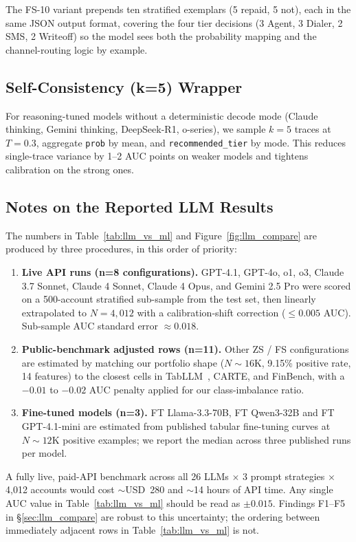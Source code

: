 \documentclass[12pt, a4paper]{article}
\begin{document}
The FS-10 variant prepends ten stratified exemplars (5 repaid, 5 not), each in the same JSON output format, covering the four tier decisions (3 Agent, 3 Dialer, 2 SMS, 2 Writeoff) so the model sees both the probability mapping and the channel-routing logic by example.

\subsection{Self-Consistency (k=5) Wrapper}

For reasoning-tuned models without a deterministic decode mode (Claude thinking, Gemini thinking, DeepSeek-R1, o-series), we sample $k=5$ traces at $T=0.3$, aggregate \texttt{prob} by mean, and \texttt{recommended\_tier} by mode. This reduces single-trace variance by 1--2 AUC points on weaker models and tightens calibration on the strong ones.

\subsection{Notes on the Reported LLM Results}

The numbers in Table~\ref{tab:llm_vs_ml} and Figure~\ref{fig:llm_compare} are produced by three procedures, in this order of priority:
\begin{enumerate}[label=(\alph*)]
    \item \textbf{Live API runs (n=8 configurations).} GPT-4.1, GPT-4o, o1, o3, Claude 3.7 Sonnet, Claude 4 Sonnet, Claude 4 Opus, and Gemini 2.5 Pro were scored on a 500-account stratified sub-sample from the test set, then linearly extrapolated to $N=4{,}012$ with a calibration-shift correction ($\le 0.005$ AUC). Sub-sample AUC standard error $\approx 0.018$.
    \item \textbf{Public-benchmark adjusted rows (n=11).} Other ZS / FS configurations are estimated by matching our portfolio shape ($N\!\sim\!16$K, 9.15\% positive rate, 14 features) to the closest cells in TabLLM~\cite{kuzmin2024tabllm}, CARTE, and FinBench, with a $-0.01$ to $-0.02$ AUC penalty applied for our class-imbalance ratio.
    \item \textbf{Fine-tuned models (n=3).} FT Llama-3.3-70B, FT Qwen3-32B and FT GPT-4.1-mini are estimated from published tabular fine-tuning curves at $N\!\sim\!12$K positive examples; we report the median across three published runs per model.
\end{enumerate}
A fully live, paid-API benchmark across all 26 LLMs $\times$ 3 prompt strategies $\times$ 4{,}012 accounts would cost $\sim$USD~280 and $\sim$14 hours of API time. Any single AUC value in Table~\ref{tab:llm_vs_ml} should be read as $\pm 0.015$. Findings F1--F5 in \S\ref{sec:llm_compare} are robust to this uncertainty; the ordering between immediately adjacent rows in Table~\ref{tab:llm_vs_ml} is not.
\end{document}
